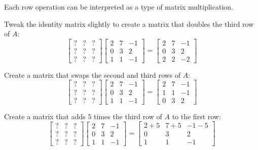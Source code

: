 \begin{applicationActivities}
\begin{activity}{15}
Each row operation can be interpreted as a type of matrix multiplication.
\begin{subactivity}
Tweak the identity matrix slightly to create a matrix that
doubles the third row of $A$:
\[
 \begin{bmatrix} ? & ? & ? \\ ? & ? & ? \\ ? & ? & ? \end{bmatrix}
 \begin{bmatrix} 2 & 7 & -1 \\ 0 & 3 & 2 \\ 1 & 1 & -1 \end{bmatrix}
=
 \begin{bmatrix} 2 & 7 & -1 \\ 0 & 3 & 2 \\ 2 & 2 & -2 \end{bmatrix}
\]
\end{subactivity}
\begin{subactivity}
  Create a matrix that swaps the second and third rows of $A$:
  \[
   \begin{bmatrix} ? & ? & ? \\ ? & ? & ? \\ ? & ? & ? \end{bmatrix}
   \begin{bmatrix} 2 & 7 & -1 \\ 0 & 3 & 2 \\ 1 & 1 & -1 \end{bmatrix}
  =
  \begin{bmatrix} 2 & 7 & -1 \\ 1 & 1 & -1 \\ 0 & 3 & 2 \end{bmatrix}
  \]
\end{subactivity}
\begin{subactivity}
Create a matrix that adds $5$ times the third row of $A$ to the first row:
\[
 \begin{bmatrix} ? & ? & ? \\ ? & ? & ? \\ ? & ? & ? \end{bmatrix}
 \begin{bmatrix} 2 & 7 & -1 \\ 0 & 3 & 2 \\ 1 & 1 & -1 \end{bmatrix}
=
 \begin{bmatrix} 2+5 & 7+5 & -1-5 \\ 0 & 3 & 2 \\ 1 & 1 & -1 \end{bmatrix}
\]
\end{subactivity}
\end{activity}


\end{applicationActivities}
